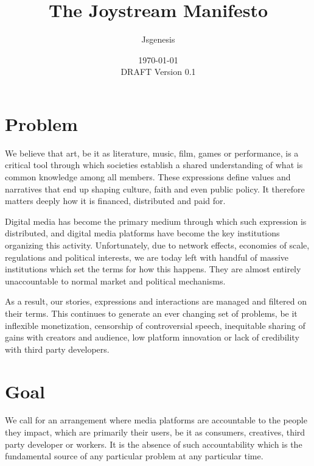\documentclass{article}
\begin{document}
%
\title{
\textbf{
The Joystream Manifesto
}
}
%
%

\author{Jsgenesis}

\date{\today \\ DRAFT Version 0.1}

\maketitle              %

\section{Problem}

We believe that art, be it as literature, music, film, games or performance, is a critical tool through which societies establish a shared understanding of what is common knowledge among all members. These expressions define values and narratives that end up shaping culture, faith and even public policy. It therefore matters deeply how it is financed, distributed and paid for.

Digital media has become the primary medium through which such expression is distributed, and digital media platforms have become the key institutions organizing this activity. Unfortunately, due to network effects, economies of scale, regulations and political interests, we are today left with handful of massive institutions which set the terms for how this happens. They are almost entirely unaccountable to normal market and political mechanisms.

As a result, our stories, expressions and interactions are managed and filtered on their terms. This continues to generate an ever changing set of problems, be it inflexible monetization, censorship of controversial speech, inequitable sharing of gains with creators and audience, low platform innovation or lack of credibility with third party developers.
    
\section{Goal}

We call for an arrangement where media platforms are accountable to the people they impact, which are primarily their users, be it as consumers, creatives, third party developer or workers. It is the absence of such accountability which is the fundamental source of any particular problem at any particular time.
    
\end{document}
